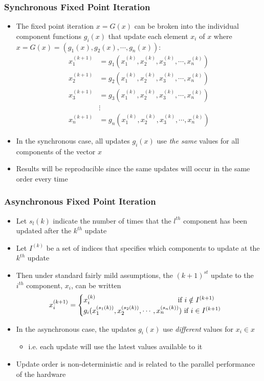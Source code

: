 \documentclass{beamer}
\begin{document}
\begin{frame}[shrink]
	\frametitle{Synchronous Fixed Point Iteration}
	\begin{itemize}
		\item The fixed point iteration $x = G(x)$ can be broken into the individual component functions $g_i(x)$ that update each element $x_i$ of $x$ where $x = G(x) = (g_1(x), g_2(x), \cdots, g_n(x))$:
		\begin{align*}
		x_1^{(k+1)} &= g_1(x_1^{(k)}, x_2^{(k)}, x_3^{(k)}, \cdots, x_n^{(k)}) \\
		x_2^{(k+1)} &= g_2(x_1^{(k)}, x_2^{(k)}, x_3^{(k)}, \cdots, x_n^{(k)}) \\
		x_3^{(k+1)} &= g_3(x_1^{(k)}, x_2^{(k)}, x_3^{(k)}, \cdots, x_n^{(k)}) \\
		&\vdots							   \\
		x_n^{(k+1)} &= g_n(x_1^{(k)}, x_2^{(k)}, x_3^{(k)}, \cdots, x_n^{(k)}) 		
		\end{align*}
		\item In the synchronous case, all updates $g_i(x)$ use {\em the same} values for all components of the vector $x$
		\item Results will be reproducible since the same updates will occur in the same order every time
	\end{itemize}
\end{frame}

\begin{frame}[shrink]
	\frametitle{Asynchronous Fixed Point Iteration}
	\begin{itemize}
		\item Let $s_l(k)$ indicate the number of times that the $l^{th}$ component has been updated after the $k^{th}$ update
		\item Let $I^{(k)}$ be a set of indices that specifies which components to update at the $k^{th}$ update
		\item Then under standard fairly mild assumptions, the $(k+1)^{st}$ update to the $i^{th}$ component, $x_i$, can be written
		{\small
			\begin{equation}
			x_i^{(k+1)} = \begin{cases} 
			x_i^{(k)} \hspace{1.55in} \text{ if } i \notin I^{(k+1)} \\
			g_i(x_1^{(s_1(k))}, x_2^{(s_2(k))}, \cdots, x_n^{(s_n(k))}) \text{ if } i \in I^{(k+1)}
			\end{cases}
			\end{equation}
		}
		\item In the asynchronous case, the updates $g_i(x)$ use {\em different} values for $x_i \in x$ 
		\begin{itemize}
			\item i.e. each update will use the latest values available to it
		\end{itemize}
		\item Update order is non-deterministic and is related to the parallel performance of the hardware
	\end{itemize}
\end{frame}
\end{document}
